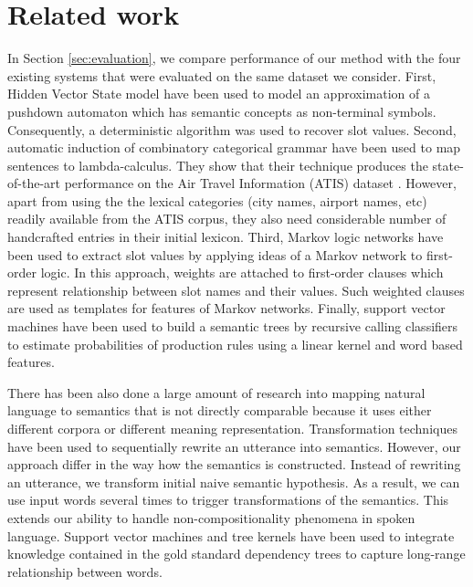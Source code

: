 \documentclass{article}
\begin{document}
\section{Related work}

In Section \ref{sec:evaluation}, we compare performance of our method with the four existing systems that were evaluated on the same dataset we consider. 
First, Hidden Vector State model \cite{he05} have been used to model an approximation of a pushdown automaton which has semantic concepts as non-terminal symbols. Consequently, a deterministic algorithm was used to recover slot values.
Second, automatic induction of combinatory categorical grammar \cite{zettlemoyer07} have been used to map sentences to lambda-calculus. 
They show that their technique produces the state-of-the-art performance on the Air Travel Information (ATIS) dataset \cite{atis94}. However, apart from using the the lexical categories (city names, airport names, etc) readily available from the ATIS corpus, they also need considerable number of handcrafted entries in their initial lexicon. 
Third, Markov logic networks \cite{meza08b} have been used to extract slot values by applying ideas of a Markov network to first-order logic. In this approach, weights are attached to first-order clauses which represent relationship between slot names and their values. Such weighted clauses are used as templates for features of Markov networks.
Finally, support vector machines \cite{mairesse09} have been used to build a semantic trees by recursive calling classifiers to estimate probabilities of production rules using a linear kernel and word based features.

There has been also done a large amount of research into mapping natural language to semantics that is not directly comparable because it uses either different corpora or different meaning representation. 
Transformation techniques \cite{kate05} have been used to sequentially rewrite an utterance into semantics. However, our approach differ in the way how the semantics is constructed. Instead of rewriting an utterance, we transform initial naive semantic hypothesis. As a result, we can use input words several times to trigger transformations of the semantics. This extends our ability to handle non-compositionality phenomena in spoken language.
Support vector machines and tree kernels \cite{kate08} have been used to integrate knowledge contained in the gold standard dependency trees to capture long-range relationship between words. 
\end{document}
